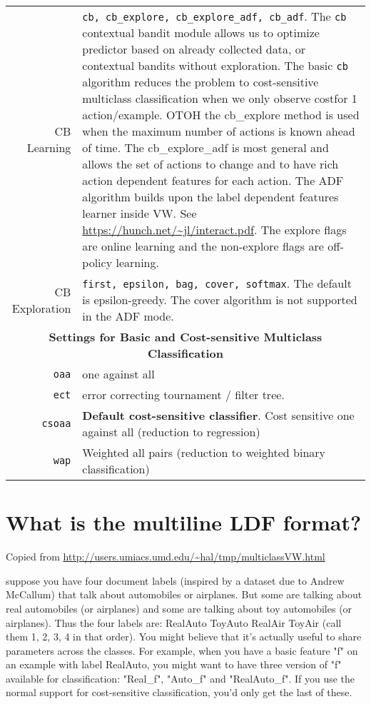\documentclass[preview,border={30 30 30 30}]{standalone}
\begin{document}
\begin{tabular}{r|p{8cm}}
    CB Learning& \verb|cb, cb_explore, cb_explore_adf, cb_adf|. The \verb|cb| contextual bandit module allows us to optimize predictor based on already collected data, or contextual bandits without exploration. The basic \verb|cb| algorithm reduces the problem to cost-sensitive multiclass classification when we only observe costfor 1 action/example. OTOH the cb\_explore method is used when the maximum number of actions is known ahead of time. The cb\_explore\_adf is most general and allows the set of actions to change and to have rich action dependent features for each action. The ADF algorithm builds upon the label dependent features learner inside VW. See \url{https://hunch.net/~jl/interact.pdf}. The explore flags are online learning and the non-explore flags are off-policy learning.\\
    CB Exploration& \verb|first, epsilon, bag, cover, softmax|. The default is epsilon-greedy. The cover algorithm is not supported in the ADF mode.\\
    \hline
    \multicolumn{2}{c}{\textbf{Settings for Basic and Cost-sensitive  Multiclass Classification}}\\\hline
    \verb|oaa|&one against all\\
    \verb|ect|&error correcting tournament / filter tree.\\
    \verb|csoaa|& \textbf{Default cost-sensitive classifier}. Cost sensitive one against all (reduction to regression)\\
    \verb|wap|& Weighted all pairs (reduction to weighted binary classification)\\
\end{tabular}

\section{What is the multiline LDF format?}
Copied from \url{http://users.umiacs.umd.edu/~hal/tmp/multiclassVW.html}

suppose you have four document labels (inspired by a dataset due to Andrew McCallum) that talk about automobiles or airplanes. But some are talking about real automobiles (or airplanes) and some are talking about toy automobiles (or airplanes). Thus the four labels are: RealAuto ToyAuto RealAir ToyAir (call them 1, 2, 3, 4 in that order). You might believe that it's actually useful to share parameters across the classes. For example, when you have a basic feature "f" on an example with label RealAuto, you might want to have three version of "f" available for classification: "Real\_f", "Auto\_f" and "RealAuto\_f". If you use the normal support for cost-sensitive classification, you'd only get the last of these.
\end{document}
